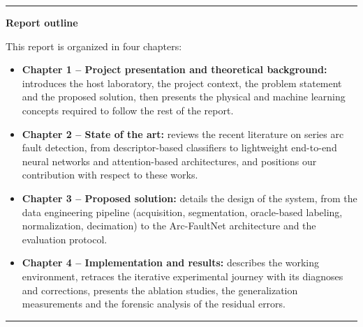 \vspace{0.6cm}
\noindent\rule{\linewidth}{0.4pt}
\vspace{0.2cm}

\noindent\textbf{Report outline}

\vspace{0.3cm}

\noindent This report is organized in four chapters:

\begin{itemize}[leftmargin=1.8cm, itemsep=3pt, topsep=4pt]
    \item \textbf{Chapter 1 -- Project presentation and theoretical background:} introduces the host laboratory, the project context, the problem statement and the proposed solution, then presents the physical and machine learning concepts required to follow the rest of the report.
    \item \textbf{Chapter 2 -- State of the art:} reviews the recent literature on series arc fault detection, from descriptor-based classifiers to lightweight end-to-end neural networks and attention-based architectures, and positions our contribution with respect to these works.
    \item \textbf{Chapter 3 -- Proposed solution:} details the design of the system, from the data engineering pipeline (acquisition, segmentation, oracle-based labeling, normalization, decimation) to the Arc-FaultNet architecture and the evaluation protocol.
    \item \textbf{Chapter 4 -- Implementation and results:} describes the working environment, retraces the iterative experimental journey with its diagnoses and corrections, presents the ablation studies, the generalization measurements and the forensic analysis of the residual errors.
\end{itemize}

\vspace{0.2cm}
\noindent\rule{\linewidth}{1pt}
